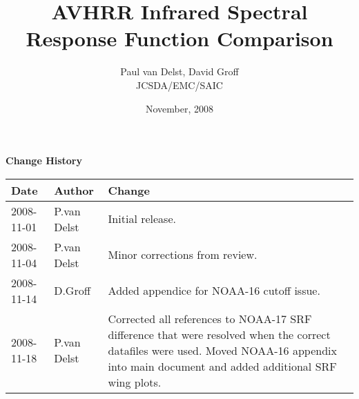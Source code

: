 



\title{AVHRR Infrared Spectral Response Function Comparison}
\author{Paul van Delst, David Groff\\JCSDA/EMC/SAIC}
\date{November, 2008}



\maketitle


\thispagestyle{empty}
\vspace*{10cm}
\begin{center}
  {\sffamily\Large\bfseries Change History}
  \begin{table}[htp]
    \centering
    \begin{tabular}{|p{2cm}|p{3cm}|p{8cm}|}
      \hline
      \sffamily\textbf{Date} & \sffamily\textbf{Author} & \sffamily\textbf{Change}\\
      \hline\hline
      2008-11-01 & P.van Delst & Initial release.\\
      \hline
      2008-11-04 & P.van Delst & Minor corrections from review.\\
      \hline
      2008-11-14 & D.Groff & Added appendice for NOAA-16 cutoff issue.\\
      \hline
      2008-11-18 & P.van Delst & Corrected all references to NOAA-17 SRF difference that were resolved when the correct datafiles were used. Moved NOAA-16 appendix into main document and added additional SRF wing plots.\\
      \hline
    \end{tabular}
  \end{table}
\end{center}
\clearpage
{}
\setcounter{page}{1}









\clearpage




\begin{appendix}
  
  
\end{appendix}



